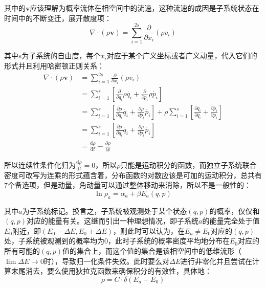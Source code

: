 \documentclass[UTF8]{ctexart}
\begin{document}
\begin{spacing}{2.0}
其中的$\textbf{v}$应该理解为概率流体在相空间中的流速，这种流速的成因是子系统状态在时间中的不断变迁，展开散度项：
\begin{equation}
\nabla\cdot(\rho\textbf{v})=\sum_{i=1}^{2s}\frac{\partial}{\partial x_{i}}(\rho v_{i})
\end{equation}

其中$s$为子系统的自由度，每个$x_{i}$对应于某个广义坐标或者广义动量，代入它们的形式并且利用哈密顿正则关系：
\begin{equation}
\begin{aligned}
\nabla\cdot(\rho\textbf{v})&=\sum_{i=1}^{2s}\frac{\partial}{\partial x_{i}}(\rho v_{i}) \\
&=\sum_{i=1}^{s}\left[\frac{\partial}{\partial q_{i}}\rho \dot{q_{i}}+\frac{\partial}{\partial p_{i}}\rho \dot{p_{i}} \right] \\
&= \sum_{i=1}^{s}\left[\frac{\partial\rho}{\partial q_{i}} \dot{q_{i}}+\frac{\partial\rho}{\partial p_{i}} \dot{p_{i}} \right]+\rho\sum_{i=1}^{s}\left[\frac{\partial \dot{q_{i}}}{\partial q_{i}}+\frac{\partial \dot{p_{i}}}{\partial p_{i}} \right]\\
&= \sum_{i=1}^{s}\left[\frac{\partial\rho}{\partial q_{i}} \dot{q_{i}}+\frac{\partial\rho}{\partial p_{i}} \dot{p_{i}} \right]\\
&=\frac{\text{d}\rho}{\text{d} t}-\frac{\partial\rho}{\partial t}
\end{aligned}
\end{equation}

所以连续性条件化归为$\frac{\text{d}\rho}{\text{d}t}=0$，所以$\rho$只能是运动积分的函数，而独立子系统联合密度可改写为连乘的形式蕴含着，分布函数的对数应该是可加的运动积分，总共有7个备选项，但是动量，角动量可以通过整体移动来消除，所以不是一般性的：
\begin{equation}
\ln \rho_{a}=\alpha_{a} + \beta E_{a}(q,p)
\end{equation}

其中$a$为子系统标记。换言之，子系统被观测处于某个状态$(q,p)$的概率，仅仅和$(q,p)$对应的能量有关。这继而引出一种理想情况，即子系统$a$的能量完全处于值$E_{0}$附近，即$(E_{0}-\Delta E,E_{0}+\Delta E)$，则此时可以认为，在$E_{a}\neq E_{0}$对应的$(q,p)$处，子系统被观测到的概率均为0，此时子系统的概率密度平均地分布在$E_{0}$对应的所有可能的$(q,p)$值的集合上，而这个值的集合是该相空间中的低维流形（$\lim \Delta E\rightarrow 0$时），导致归一化条件失效。此时要么对$\Delta E$进行非零化并且尝试在计算末尾消去，要么使用狄拉克函数来确保积分的有效性，具体地：
\begin{equation}
\rho = C\cdot \delta(E_{a}-E_{0})
\end{equation}


\end{spacing}
\end{document}
